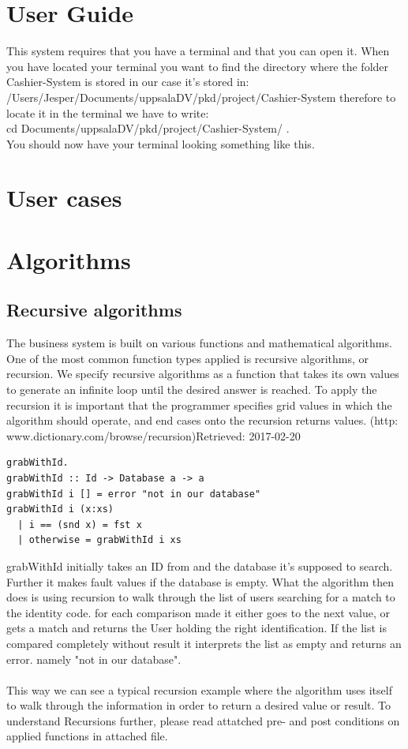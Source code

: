 \documentclass[11pt]{article}
\begin{document}
\section{User Guide}
This system requires that you have a terminal and that you can open it. When you have located your terminal you want to find the directory where the folder Cashier-System is stored in our case it’s stored in:\\ /Users/Jesper/Documents/uppsalaDV/pkd/project/Cashier-System therefore to locate it in the terminal we have to write:\\ cd Documents/uppsalaDV/pkd/project/Cashier-System/ .\\ You should now have your terminal looking something like this.
\section{User cases}
\section{Algorithms}
\subsection{Recursive algorithms}
The business system is built on various functions and mathematical algorithms. One of the most common function types applied is recursive algorithms, or recursion. We specify recursive algorithms as a function that takes its own values to generate an infinite loop until the desired answer is reached. To apply the recursion it is important that the programmer specifies grid values in which the algorithm should operate, and end cases onto the recursion returns values. (http:\\www.dictionary.com/browse/recursion)Retrieved: 2017-02-20 \\
\begin{lstlisting}
grabWithId.
grabWithId :: Id -> Database a -> a
grabWithId i [] = error "not in our database"
grabWithId i (x:xs)
  | i == (snd x) = fst x
  | otherwise = grabWithId i xs
\end{lstlisting}
grabWithId initially takes an ID from and the database it’s supposed to search. Further it makes fault values if the database is empty. What the algorithm then does is using recursion to walk through the list of users searching for a match to the identity code. for each comparison made it either goes to the next value, or gets a match and returns the User holding the right identification. If the list is compared completely without result it interprets the list as empty and returns an error. namely "not in our database".\\
\\
This way we can see a typical recursion example where the algorithm uses itself to walk through the information in order to return a desired value or result.
To understand Recursions further, please read attatched pre- and post conditions on applied functions in attached file.\\
\end{document}
